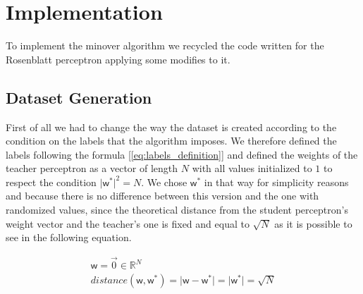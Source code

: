 \section{Implementation}
\label{sec:implementation}


To implement the minover algorithm we recycled the code written for the Rosenblatt perceptron applying some modifies to it.

\subsection{Dataset Generation}
First of all we had to change the way the dataset is created according to the condition on the labels that the algorithm imposes.
We therefore defined the labels following the formula [\ref{eq:labels_definition}] and defined the weights of the teacher perceptron
as a vector of length $N$ with all values initialized to $1$ to respect the condition $\lvert \bm{\mathsf{w}}^* \rvert^2 = N$.
We chose $\bm{\mathsf{w}}^*$ in that way for simplicity reasons and because there is no difference between this version and
the one with randomized values, since the theoretical distance from the student perceptron's weight vector and the teacher's one is
fixed and equal to $\sqrt{N}$ as it is possible to see in the following equation.

\begin{gather*}
    \bm{\mathsf{w}} = \overrightarrow{0} \in \mathbb{R}^N \\
    distance(\bm{\mathsf{w}}, \bm{\mathsf{w}}^*) = \lvert \bm{\mathsf{w}} - \bm{\mathsf{w}}^* \rvert = \lvert \bm{\mathsf{w}}^* \rvert = \sqrt{N}
\end{gather*}

